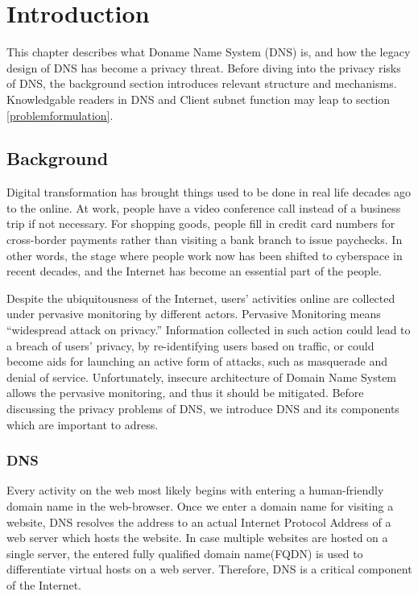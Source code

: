 \documentclass[a4paper,12pt]{article}
\begin{document}
\newpage
{}
\tableofcontents %
\newpage
{}

%
%

\section{Introduction}
This chapter describes what Doname Name System (DNS) is, and how the legacy design of DNS has become a privacy threat. Before diving into the privacy risks of DNS, the background section introduces relevant structure and mechanisms. Knowledgable readers in DNS and Client subnet function may leap to section \ref{problemformulation}.

\subsection{Background}
Digital transformation has brought things used to be done in real life decades ago to the online. At work, people have a video conference call instead of a business trip if not necessary. For shopping goods, people fill in credit card numbers for cross-border payments rather than visiting a bank branch to issue paychecks. In other words, the stage where people work now has been shifted to cyberspace in recent decades, and the Internet has become an essential part of the people.

Despite the ubiquitousness of the Internet, users' activities online are collected under pervasive monitoring by different actors.
Pervasive Monitoring means ``widespread attack on privacy\cite{rfc7258}.'' Information collected in such action could lead to a breach of users’ privacy, by re-identifying users based on traffic\cite{herrmann2010analyzing}, or could become aids for launching an active form of attacks, such as masquerade and denial of service.
Unfortunately, insecure architecture of Domain Name System allows the pervasive monitoring, and thus it should be mitigated. Before discussing the privacy problems of DNS, we introduce DNS and its components which are important to adress.

\subsubsection{DNS}
Every activity on the web most likely begins with entering a human-friendly domain name in the web-browser. Once we enter a domain name for visiting a website, DNS resolves the address to an actual Internet Protocol Address of a web server which hosts the website. In case multiple websites are hosted on a single server, the entered fully qualified domain name(FQDN) is used to differentiate virtual hosts on a web server\cite{virtual24host}. Therefore, DNS is a critical component of the Internet.
\end{document}
